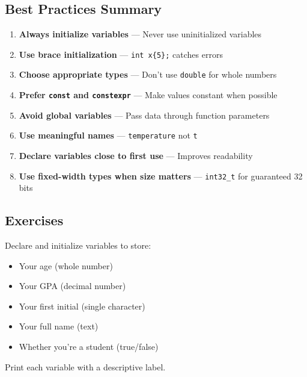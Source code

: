 \subsection{Best Practices Summary}

\begin{enumerate}
	\item \textbf{Always initialize variables} — Never use uninitialized variables
	
	\item \textbf{Use brace initialization} — \texttt{int x\{5\};} catches errors
	
	\item \textbf{Choose appropriate types} — Don't use \texttt{double} for whole numbers
	
	\item \textbf{Prefer \texttt{const} and \texttt{constexpr}} — Make values constant when possible
	
	\item \textbf{Avoid global variables} — Pass data through function parameters
	
	\item \textbf{Use meaningful names} — \texttt{temperature} not \texttt{t}
	
	\item \textbf{Declare variables close to first use} — Improves readability
	
	\item \textbf{Use fixed-width types when size matters} — \texttt{int32\_t} for guaranteed 32 bits
\end{enumerate}

\subsection{Exercises}

\begin{example}{\leavevmode}
	
	Declare and initialize variables to store:
	\begin{itemize}
		\item Your age (whole number)
		\item Your GPA (decimal number)
		\item Your first initial (single character)
		\item Your full name (text)
		\item Whether you're a student (true/false)
	\end{itemize}
	
	Print each variable with a descriptive label.
\end{example}

